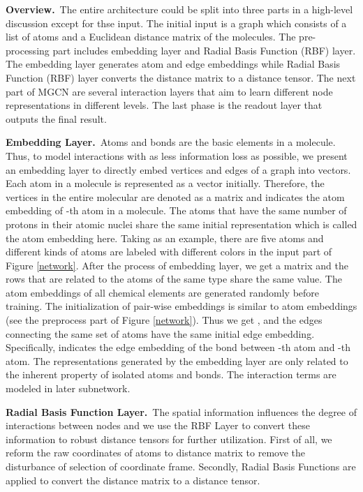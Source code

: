 \documentclass[letterpaper]{article} \usepackage{bm}
\begin{document}
\textbf{Overview.}\ The entire architecture could be split into three parts in a high-level discussion except for thse input. The initial input is a graph which consists of a list of atoms and a Euclidean distance matrix of the molecules. The pre-processing part includes embedding layer and Radial Basis Function (RBF) layer. The embedding layer generates atom and edge embeddings while Radial Basis Function (RBF) layer converts the distance matrix to a distance tensor. The next part of MGCN are several interaction layers that aim to learn different node representations in different levels. The last phase is the readout layer that outputs the final result. 

\textbf{Embedding Layer.}\ Atoms and bonds are the basic elements in a molecule. Thus, to model interactions with as less information loss as possible, we present an embedding layer to directly embed vertices and edges of a graph into vectors.
Each atom in a molecule is represented as a vector  initially. Therefore, the vertices in the entire molecular are denoted as a matrix  and  indicates the atom embedding of -th atom in a molecule. The atoms that have the same number of protons in their atomic nuclei share the same initial representation which is called the atom embedding here. Taking  as an example, there are five atoms and different kinds of atoms are labeled with different colors in the input part of Figure \ref{network}. After the process of embedding layer, we get a  matrix and the rows that are related to the atoms of the same type share the same value. The atom embeddings of all chemical elements are generated randomly before training. The initialization of pair-wise embeddings  is similar to atom embeddings (see the preprocess part of Figure \ref{network}). Thus we get , and the edges connecting the same set of atoms have the same initial edge embedding. Specifically,  indicates the edge embedding of the bond between -th atom and -th atom. The representations generated by the embedding layer are only related to the inherent property of isolated atoms and bonds. The interaction terms are modeled in later subnetwork.  


\textbf{Radial Basis Function Layer.}\ The spatial information influences the degree of interactions between nodes and we use the RBF Layer to convert these information to robust distance tensors for further utilization. First of all, we reform the raw coordinates of atoms to distance matrix to remove the disturbance of selection of coordinate frame. Secondly, Radial Basis Functions are applied to convert the distance matrix to a distance tensor.
\end{document}
